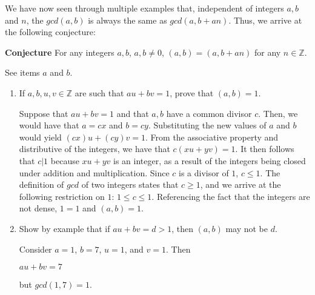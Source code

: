 \documentclass[12pt]{article}
\newcommand{\Z}{\mathbb{Z}}
\newenvironment{problem}[2][Problem]{\begin{trivlist}
\item[\hskip \labelsep {\bfseries #1}\hskip \labelsep {\bfseries #2.}]}{\end{trivlist}}
\newenvironment{nscenter}
 {\parskip=0pt\par\nopagebreak\centering}
 {\par\noindent\ignorespacesafterend}
\begin{document}
\begin{problem}{4}
\begin{enumerate}[label=(\alph*)]
\noindent
We have now seen through multiple examples that, independent of integers $a, b$ and $n$, the $gcd(a,b)$ is always the same as $gcd(a,b+an)$. Thus, we arrive at the following conjecture:

\vspace{.2cm}

\begin{nscenter}
\textbf{Conjecture} %
For any integers $a,b$, $a,b \neq 0$, $(a,b)=(a,b+an)$ for any $n \in \Z$.
\end{nscenter}
\end{enumerate}
\end{problem}


\begin{problem}{5} See items $a$ and $b$.
\begin{enumerate}[label=(\alph*)] 
\item If $a,b,u,v \in \mathbb{Z}$ are such that $au+bv=1$, prove that $(a,b)=1$.

\noindent
Suppose that $au+bv=1$ and that $a,b$ have a common divisor $c$. Then, we would have that $a=cx$ and $b=cy$. Substituting the new values of $a$ and $b$ would yield $(cx)u+(cy)v=1$. From the associative property and distributive of the integers, we have that $c(xu+yv)=1$. It then follows that $c|1$ because $xu+yv$ is an integer, as a result of the integers being closed under addition and multiplication. Since $c$ is a divisor of $1$, $c \leq 1$. The definition of $gcd$ of two integers states that $c \geq 1$, and we arrive at the following restriction on $1$: $1 \leq c \leq 1$. Referencing the fact that the integers are not dense, $1=1$ and $(a,b)=1$. \qedsymbol

\item Show by example that if $au+bv=d>1$, then $(a,b)$ may not be $d$. 

\vspace{.1cm}

\noindent
Consider $a=1$, $b=7$, $u=1$, and $v=1$. Then

\begin{center}
$au+bv=7$
\end{center}

but $gcd(1,7)=1$.
\end{enumerate}
\end{problem}
\end{document}
